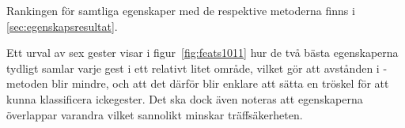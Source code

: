 \documentclass[../rapport_MVEX01-11-05]{subfiles}
\begin{document}
Rankingen för samtliga egenskaper med de respektive metoderna finns i
\ref{sec:egenskapsresultat}.

Ett urval av sex gester visar i
figur~\vref{fig:feats1011} hur de två bästa egenskaperna tydligt samlar varje
gest i ett relativt litet område, vilket gör att avstånden i \knn-metoden 
blir mindre, och att det därför blir enklare att sätta en tröskel för att
kunna klassificera ickegester. Det ska dock även noteras att egenskaperna 
överlappar varandra vilket sannolikt minskar träffsäkerheten.
\end{document}
